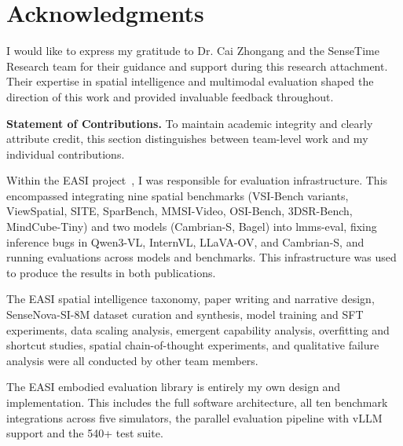 \chapter*{Acknowledgments}

I would like to express my gratitude to Dr. Cai Zhongang and the SenseTime Research team for their guidance and support during this research attachment. Their expertise in spatial intelligence and multimodal evaluation shaped the direction of this work and provided invaluable feedback throughout.

\vspace{1em}

\textbf{Statement of Contributions.} To maintain academic integrity and clearly attribute credit, this section distinguishes between team-level work and my individual contributions.

Within the EASI project~\cite{cai2025holisticevaluationmultimodalllms, cai2025scalingspatialintelligencemultimodal}, I was responsible for evaluation infrastructure. This encompassed integrating nine spatial benchmarks (VSI-Bench variants, ViewSpatial, SITE, SparBench, MMSI-Video, OSI-Bench, 3DSR-Bench, MindCube-Tiny) and two models (Cambrian-S, Bagel) into lmms-eval, fixing inference bugs in Qwen3-VL, InternVL, LLaVA-OV, and Cambrian-S, and running evaluations across models and benchmarks. This infrastructure was used to produce the results in both publications.

The EASI spatial intelligence taxonomy, paper writing and narrative design, SenseNova-SI-8M dataset curation and synthesis, model training and SFT experiments, data scaling analysis, emergent capability analysis, overfitting and shortcut studies, spatial chain-of-thought experiments, and qualitative failure analysis were all conducted by other team members.

The EASI embodied evaluation library is entirely my own design and implementation. This includes the full software architecture, all ten benchmark integrations across five simulators, the parallel evaluation pipeline with vLLM support and the 540+ test suite.
